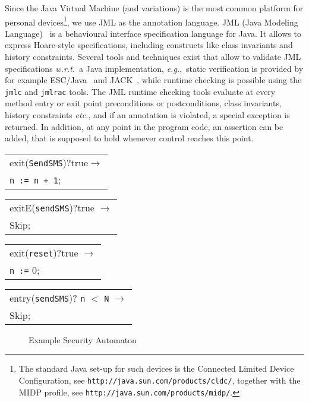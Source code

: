 
Since the Java Virtual Machine (and variations) is the most common
platform for personal devices\footnote{The standard Java set-up for
such devices is the Connected Limited Device Configuration, see
\texttt{http://java.sun.com/products/cldc/}, together with the MIDP
profile, see \texttt{http://java.sun.com/products/midp/}.}, we use JML
as the annotation language.  JML (Java
Modeling Language)~\cite{LeavensPCCRCK05} is a behavioural interface
specification language for Java. It allows to express Hoare-style
specifications, including constructs like class invariants
and history constraints. Several tools and techniques exist that allow
to validate JML specifications \emph{w.r.t.}\ a Java implementation,
\emph{e.g.},\ static verification is provided by
for example ESC/Java~\cite{CokK04} and
JACK~\cite{BartheBCGHMPPSV06}, while runtime checking is possible
using the \texttt{jmlc} and \texttt{jmlrac} tools. The JML runtime
checking tools evaluate at every method entry or exit point
preconditions or postconditions, class invariants, history constraints
\emph{etc.}, and if an annotation is violated, a special exception is
returned. In addition, at any point in the program code, an assertion
can be added, that is supposed to hold whenever control reaches this
point.

{\begin{tabular}{l}
\tiny{\textsf{exit}(\texttt{SendSMS})?\textsf{true}\(\rightarrow\)}\vspace*{-.8em}\\
\tiny{\texttt{n := n + 1};}
\end{tabular}}
{\begin{tabular}{l}
\tiny{\textsf{exitE}(\texttt{sendSMS})?\textsf{true} \(\rightarrow\)}\vspace*{-.8em}\\
\tiny{\textsf{Skip};}
\end{tabular}}
{\begin{tabular}{l}
\tiny{\textsf{exit}(\texttt{reset})?\textsf{true} \(\rightarrow\)}\vspace*{-.8em} \\
\tiny{\texttt{n :=} 0;}
\end{tabular}}
{\begin{tabular}{l}
\tiny{\textsf{entry}(\texttt{sendSMS})? \texttt{n} \(<\) \texttt{N} \(\rightarrow\)} \vspace*{-.8em} \\
\tiny{\textsf{Skip};}
\end{tabular}}
\begin{figure}[t]
\begin{center}
\end{center}
\caption{Example Security Automaton}\label{FigExample}
\end{figure}

